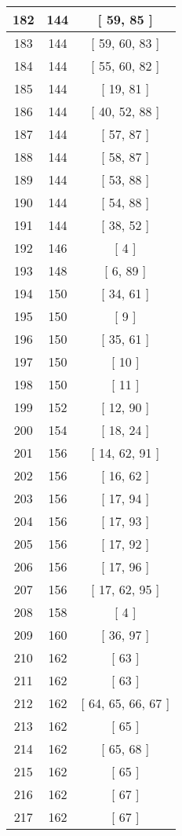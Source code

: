 \begin{center}
\begin{longtable}[H]{|| c c c ||}
\hline
182 & 144 & [ 59, 85 ] \\ 
\hline
183 & 144 & [ 59, 60, 83 ] \\ 
\hline
184 & 144 & [ 55, 60, 82 ] \\ 
\hline
185 & 144 & [ 19, 81 ] \\ 
\hline
186 & 144 & [ 40, 52, 88 ] \\ 
\hline
187 & 144 & [ 57, 87 ] \\ 
\hline
188 & 144 & [ 58, 87 ] \\ 
\hline
189 & 144 & [ 53, 88 ] \\ 
\hline
190 & 144 & [ 54, 88 ] \\ 
\hline
191 & 144 & [ 38, 52 ] \\ 
\hline
192 & 146 & [ 4 ] \\ 
\hline
193 & 148 & [ 6, 89 ] \\ 
\hline
194 & 150 & [ 34, 61 ] \\ 
\hline
195 & 150 & [ 9 ] \\ 
\hline
196 & 150 & [ 35, 61 ] \\ 
\hline
197 & 150 & [ 10 ] \\ 
\hline
198 & 150 & [ 11 ] \\ 
\hline
199 & 152 & [ 12, 90 ] \\ 
\hline
200 & 154 & [ 18, 24 ] \\ 
\hline
201 & 156 & [ 14, 62, 91 ] \\ 
\hline
202 & 156 & [ 16, 62 ] \\ 
\hline
203 & 156 & [ 17, 94 ] \\ 
\hline
204 & 156 & [ 17, 93 ] \\ 
\hline
205 & 156 & [ 17, 92 ] \\ 
\hline
206 & 156 & [ 17, 96 ] \\ 
\hline
207 & 156 & [ 17, 62, 95 ] \\ 
\hline
208 & 158 & [ 4 ] \\ 
\hline
209 & 160 & [ 36, 97 ] \\ 
\hline
210 & 162 & [ 63 ] \\ 
\hline
211 & 162 & [ 63 ] \\ 
\hline
212 & 162 & [ 64, 65, 66, 67 ] \\ 
\hline
213 & 162 & [ 65 ] \\ 
\hline
214 & 162 & [ 65, 68 ] \\ 
\hline
215 & 162 & [ 65 ] \\ 
\hline
216 & 162 & [ 67 ] \\ 
\hline
217 & 162 & [ 67 ] \\ 

\end{longtable}
\end{center}
